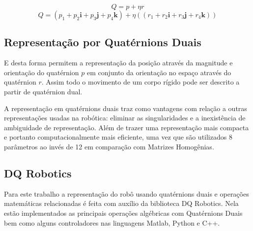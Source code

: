 \begin{equation}
    Q = p + \eta r
\end{equation}
\begin{equation}
    Q = (p_1 + p_2\mathbf{{i}} + p_3\mathbf{{j}} + p_4\mathbf{{k}}) + \eta ((r_1 + r_2\mathbf{{i}} + r_3\mathbf{{j}} + r_4\mathbf{{k}}))
\end{equation}

\subsection{Representação por Quatérnions Duais}

E desta forma permitem a representação da posição através da magnitude e orientação do quatérnion $p$ em conjunto da orientação no espaço através do quatérnion $r$. Assim todo o movimento de um corpo rígido pode ser descrito a partir de quatérnion dual.

A representação em quatérnions duais traz como vantagens com relação a outras representações usadas na robótica: eliminar as singularidades e a inexistência de ambiguidade de representação. Além de trazer uma representação mais compacta e portanto computacionalmente mais eficiente, uma vez que são utilizados 8 parâmetros ao invés de 12 em comparação com Matrizes Homogênias. %

\subsection{DQ Robotics}

Para este trabalho a representação do robô usando quatérnions duais e operações matemáticas relacionadas é feita com auxílio da biblioteca DQ Robotics. Nela estão implementados as principais operações algébricas com Quatérnions Duais bem como alguns controladores nas linguagens Matlab, Python e C++.




